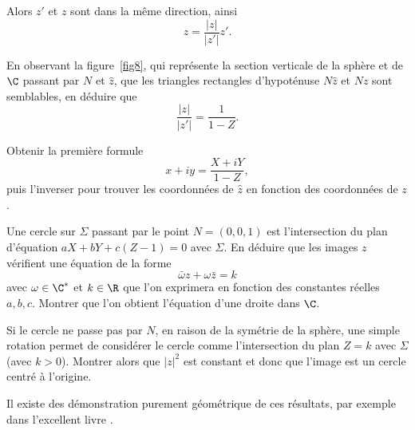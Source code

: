 \begin{exer}
Alors $z'$ et $z$ sont dans la même direction, ainsi
\[z=\frac{\lvert z \rvert}{\lvert z' \rvert} z'.\]
\begin{MYenumerate}
\item En observant la figure~\ref{fig8}, qui représente la section verticale de la sphère et de $\C$ passant par $N$ et $\hat{z}$, que les triangles rectangles d'hypoténuse $N \hat{z}$ et $Nz$ sont semblables, en déduire que 
\[\frac{\lvert z \rvert}{\lvert z' \rvert} = \frac{1}{1-Z}.\]
\item Obtenir la première formule
\[x+iy = \frac{X+i Y}{1-Z},\]
puis l'inverser pour trouver les coordonnées de $\hat{z}$ en fonction des coordonnées de $z$.
\item Une cercle sur $\Sigma$ passant par le point $N=(0,0,1)$ est l'intersection du plan d'équation $a X + b Y +c(Z-1)=0$ avec $\Sigma$. En déduire que les images $z$ vérifient une équation de la forme
\[\bar{\omega} z + \omega \bar{z}=k \]
avec $\omega  \in \C^\ast$ et $k \in \R$ que l'on exprimera en fonction des constantes réelles $a,b,c$. Montrer que l'on obtient l'équation d'une droite dans $\C$.
\item Si le cercle ne passe pas par $N$, en raison de la symétrie de la sphère, une simple rotation permet de considérer le cercle comme l'intersection du plan $Z=k$ avec $\Sigma$ (avec $k>0$). Montrer alors que $\lvert z\rvert ^2$ est constant et donc que l'image est un cercle centré à l'origine.  
\end{MYenumerate}
Il existe des démonstration purement géométrique de ces résultats, par exemple dans l'excellent livre \cite{hilbert1983geometry}.
\end{exer}